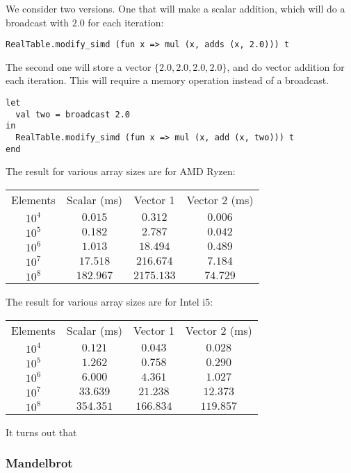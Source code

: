 \documentclass{article}
\begin{document}
We consider two versions. One that will make a scalar addition, which will do a broadcast with $2.0$ for each iteration:
\begin{lstlisting}
RealTable.modify_simd (fun x => mul (x, adds (x, 2.0))) t
\end{lstlisting}
The second one will store a vector $\{ 2.0, 2.0, 2.0, 2.0 \}$, and do vector addition for each iteration. This will require a memory operation instead of a broadcast.
\begin{lstlisting}
let
  val two = broadcast 2.0
in
  RealTable.modify_simd (fun x => mul (x, add (x, two))) t
end
\end{lstlisting}
The result for various array sizes are for AMD Ryzen:
\begin{center}
\begin{tabular}{ c c c c }
    Elements & Scalar (ms) & Vector 1 & Vector 2 (ms) \\
    $10^4$ & $0.015$ & $0.312$ & $0.006$ \\
    $10^5$ & $0.182$ & $2.787$ & $0.042$ \\
    $10^6$ & $1.013$ & $18.494$ & $0.489$ \\
    $10^7$ & $17.518$ & $216.674$ & $7.184$ \\
    $10^8$ & $182.967$ & $2175.133$ & $74.729$ \\
\end{tabular}
\end{center}

The result for various array sizes are for Intel i5:
\begin{center}
\begin{tabular}{ c c c c }
    Elements & Scalar (ms) & Vector 1 & Vector 2 (ms) \\
    $10^4$ & $0.121$ & $0.043$ & $0.028$ \\
    $10^5$ & $1.262$ & $0.758$ & $0.290$ \\
    $10^6$ & $6.000$ & $4.361$ & $1.027$ \\
    $10^7$ & $33.639$ & $21.238$ & $12.373$ \\
    $10^8$ & $354.351$ & $166.834$ & $119.857$ \\
\end{tabular}
\end{center}

It turns out that 

\subsubsection{Mandelbrot}
\end{document}

